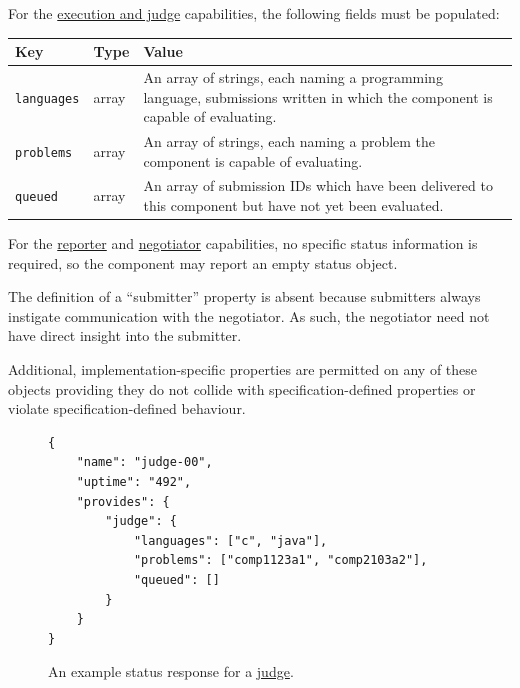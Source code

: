 \documentclass[11pt,letterpaper]{article}
\begin{document}
For the \hyperref[design-exec-judge]{execution and judge} capabilities,
the following fields must be populated:

\nopagebreak
\begin{tabulary}{\textwidth}{ | l | l | L | }
    \hline
    \textbf{Key} & \textbf{Type} & \textbf{Value} \\
    \hline
    \texttt{languages} & array & An array of strings, each naming a programming
        language, submissions written in which the component is capable of
        evaluating. \\
    \hline
    \texttt{problems} & array & An array of strings, each naming a problem the
        component is capable of evaluating. \\
    \hline
    \texttt{queued} & array & An array of submission IDs which have been
        delivered to this component but have not yet been evaluated. \\
    \hline
\end{tabulary}

For the \hyperref[design-reporter]{reporter} and
\hyperref[design-hub]{negotiator} capabilities, no specific status information
is required, so the component may report an empty status object.

The definition of a ``submitter'' property is absent because submitters always
instigate communication with the negotiator. As such, the negotiator need not
have direct insight into the submitter.

Additional, implementation-specific properties are permitted on any of these
objects providing they do not collide with specification-defined properties or
violate specification-defined behaviour.

\begin{figure}
\begin{lstlisting}
{
    "name": "judge-00",
    "uptime": "492",
    "provides": {
        "judge": {
            "languages": ["c", "java"],
            "problems": ["comp1123a1", "comp2103a2"],
            "queued": []
        }
    }
}
\end{lstlisting}
\caption{An example status response for a \hyperref[design-exec-judge]{judge}.}
\label{formats-status-listing}
\end{figure}
\end{document}
